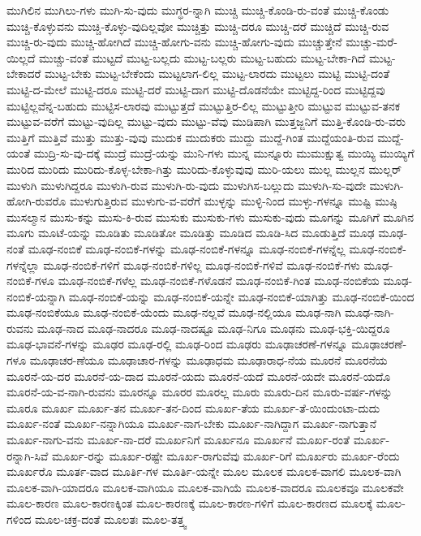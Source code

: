 {ಮುಗಿಲಿನ
ಮುಗಿಲು-ಗಳು
ಮುಗಿ-ಸು-ವುದು
ಮುಗ್ಧರ-ನ್ನಾಗಿ
ಮುಚ್ಚಿ
ಮುಚ್ಚಿ-ಕೊಂಡಿ-ರು-ವಂತೆ
ಮುಚ್ಚಿ-ಕೊಂಡು
ಮುಚ್ಚಿ-ಕೊಳ್ಳುವನು
ಮುಚ್ಚಿ-ಕೊಳ್ಳು-ವುದಿಲ್ಲವೋ
ಮುಚ್ಚಿತ್ತು
ಮುಚ್ಚಿ-ದರೂ
ಮುಚ್ಚಿ-ದರೆ
ಮುಚ್ಚಿದೆ
ಮುಚ್ಚಿ-ರುವ
ಮುಚ್ಚಿ-ರು-ವುದು
ಮುಚ್ಚಿ-ಹೋಗಿದೆ
ಮುಚ್ಚಿ-ಹೋಗು-ವನು
ಮುಚ್ಚಿ-ಹೋಗು-ವುದು
ಮುಚ್ಚುತ್ತೇನೆ
ಮುಚ್ಚು-ಮರೆ-ಯಿಲ್ಲದೆ
ಮುಚ್ಚು-ವಂತೆ
ಮುಟ್ಟದೆ
ಮುಟ್ಟ-ಬಲ್ಲದು
ಮುಟ್ಟ-ಬಲ್ಲರು
ಮುಟ್ಟ-ಬಹುದು
ಮುಟ್ಟ-ಬೇಕಾ-ಗಿದೆ
ಮುಟ್ಟ-ಬೇಕಾದರೆ
ಮುಟ್ಟ-ಬೇಕು
ಮುಟ್ಟ-ಬೇಕೆಂದು
ಮುಟ್ಟಲಾಗ-ಲಿಲ್ಲ
ಮುಟ್ಟ-ಲಾರದು
ಮುಟ್ಟಲು
ಮುಟ್ಟಿ
ಮುಟ್ಟಿ-ದಂತೆ
ಮುಟ್ಟಿ-ದ-ಮೇಲೆ
ಮುಟ್ಟಿ-ದರೂ
ಮುಟ್ಟಿ-ದರೆ
ಮುಟ್ಟಿ-ದಾಗ
ಮುಟ್ಟಿ-ದೊಡನೆಯೇ
ಮುಟ್ಟಿದ್ದ-ರಿಂದ
ಮುಟ್ಟಿದ್ದವು
ಮುಟ್ಟಿಲ್ಲವೆನ್ನ-ಬಹುದು
ಮುಟ್ಟಿಸ-ಲಾರವು
ಮುಟ್ಟುತ್ತದೆ
ಮುಟ್ಟುತ್ತಿರ-ಲಿಲ್ಲ
ಮುಟ್ಟುತ್ತೀರಿ
ಮುಟ್ಟುವ
ಮುಟ್ಟುವ-ತನಕ
ಮುಟ್ಟುವ-ವರೆಗೆ
ಮುಟ್ಟು-ವುದಿಲ್ಲ
ಮುಟ್ಟು-ವುದು
ಮುಟ್ಟು-ವೆವು
ಮುಡಿಪಾಗಿ
ಮುತ್ತಜ್ಜನಿಗೆ
ಮುತ್ತಿ-ಕೊಂಡಿ-ರು-ವರು
ಮುತ್ತಿಗೆ
ಮುತ್ತಿವೆ
ಮುತ್ತು
ಮುತ್ತು-ವುವು
ಮುದುಕ
ಮುದುಕರು
ಮುದ್ದು
ಮುದ್ದೆ-ಗಿಂತ
ಮುದ್ದೆಯಂತಿ-ರುವ
ಮುದ್ದೆ-ಯಂತೆ
ಮುದ್ರಿ-ಸು-ವು-ದಕ್ಕೆ
ಮುದ್ರೆ
ಮುದ್ರೆ-ಯನ್ನು
ಮುನಿ-ಗಳು
ಮುನ್ನ
ಮುನ್ನೂರು
ಮುಮುಕ್ಷುತ್ವ
ಮುಯ್ಯಿ
ಮುಯ್ಯಿಗೆ
ಮುರಿದ
ಮುರಿದು
ಮುರಿದು-ಕೊಳ್ಳ-ಬೇಕಾ-ಗಿತ್ತು
ಮುರಿದು-ಕೊಳ್ಳುವುವು
ಮುರಿ-ಯಲು
ಮುಲ್ಲ
ಮುಲ್ಲನ
ಮುಲ್ಲರ್
ಮುಳುಗಿ
ಮುಳುಗಿದ್ದರೂ
ಮುಳುಗಿ-ರುವ
ಮುಳುಗಿ-ರು-ವುದು
ಮುಳುಗಿಸ-ಬಲ್ಲುದು
ಮುಳುಗಿ-ಸು-ವುದೇ
ಮುಳುಗಿ-ಹೋಗಿ-ರುವರೊ
ಮುಳುಗುತ್ತಿರುವ
ಮುಳುಗು-ವ-ವರೆಗೆ
ಮುಳ್ಳನ್ನು
ಮುಳ್ಳಿ-ನಿಂದ
ಮುಳ್ಳು-ಗಳನ್ನೂ
ಮುಷ್ಟಿ
ಮುಷ್ಠಿ
ಮುಸಲ್ಮಾನ
ಮುಸು-ಕನ್ನು
ಮುಸು-ಕಿ-ರುವ
ಮುಸುಕು
ಮುಸುಕು-ಗಳು
ಮುಸುಕು-ವುದು
ಮೂಗನ್ನು
ಮೂಗಿಗೆ
ಮೂಗಿನ
ಮೂಗು
ಮೂಟೆ-ಯನ್ನು
ಮೂಡಿತು
ಮೂಡಿತೋ
ಮೂಡಿತ್ತು
ಮೂಡಿದ
ಮೂಡಿ-ಸಿದ
ಮೂಡುತ್ತಿದೆ
ಮೂಢ
ಮೂಢ-ನಂತೆ
ಮೂಢ-ನಂಬಿಕೆ
ಮೂಢ-ನಂಬಿಕೆ-ಗಳನ್ನು
ಮೂಢ-ನಂಬಿಕೆ-ಗಳನ್ನೂ
ಮೂಢ-ನಂಬಿಕೆ-ಗಳನ್ನೆಲ್ಲ
ಮೂಢ-ನಂಬಿಕೆ-ಗಳನ್ನೆಲ್ಲಾ
ಮೂಢ-ನಂಬಿಕೆ-ಗಳಿಗೆ
ಮೂಢ-ನಂಬಿಕೆ-ಗಳಿಲ್ಲ
ಮೂಢ-ನಂಬಿಕೆ-ಗಳಿವೆ
ಮೂಢ-ನಂಬಿಕೆ-ಗಳು
ಮೂಢ-ನಂಬಿಕೆ-ಗಳೂ
ಮೂಢ-ನಂಬಿಕೆ-ಗಳೆಲ್ಲ
ಮೂಢ-ನಂಬಿಕೆ-ಗಳೊಡನೆ
ಮೂಢ-ನಂಬಿಕೆ-ಗಿಂತ
ಮೂಢ-ನಂಬಿಕೆಯ
ಮೂಢ-ನಂಬಿಕೆ-ಯನ್ನಾಗಿ
ಮೂಢ-ನಂಬಿಕೆ-ಯನ್ನು
ಮೂಢ-ನಂಬಿಕೆ-ಯನ್ನೇ
ಮೂಢ-ನಂಬಿಕೆ-ಯಾಗಿತ್ತು
ಮೂಢ-ನಂಬಿಕೆ-ಯಿಂದ
ಮೂಢ-ನಂಬಿಕೆಯೂ
ಮೂಢ-ನಂಬಿಕೆ-ಯೆಂದು
ಮೂಢ-ನಲ್ಲವೆ
ಮೂಢ-ನಲ್ಲಿಯೂ
ಮೂಢ-ನಾಗಿ
ಮೂಢ-ನಾಗಿ-ರುವನು
ಮೂಢ-ನಾದ
ಮೂಢ-ನಾದರೂ
ಮೂಢ-ನಾದಷ್ಟೂ
ಮೂಢ-ನಿಗೂ
ಮೂಢನು
ಮೂಢ-ಭಕ್ತಿ-ಯಿದ್ದರೂ
ಮೂಢ-ಭಾವನೆ-ಗಳನ್ನು
ಮೂಢರ
ಮೂಢ-ರಲ್ಲಿ
ಮೂಢ-ರಿಂದ
ಮೂಢರು
ಮೂಢಾಚರಣೆ-ಗಳನ್ನೂ
ಮೂಢಾಚರಣೆ-ಗಳೂ
ಮೂಢಾಚರ-ಣೆಯೂ
ಮೂಢಾಚಾರ-ಗಳನ್ನು
ಮೂಢಾಧಮ
ಮೂಢಾರಾಧ-ನೆಯ
ಮೂರನೆ
ಮೂರನೆಯ
ಮೂರನೆ-ಯ-ದರ
ಮೂರನೆ-ಯ-ದಾದ
ಮೂರನೆ-ಯದು
ಮೂರನೆ-ಯದೆ
ಮೂರನೆ-ಯದೇ
ಮೂರನೆ-ಯದೊ
ಮೂರನೆ-ಯ-ವ-ನಾಗಿ-ರುವನು
ಮೂರನ್ನೂ
ಮೂರರ
ಮೂರಲ್ಲ
ಮೂರು
ಮೂರು-ದಿನ
ಮೂರು-ವರ್ಷ-ಗಳನ್ನು
ಮೂರೂ
ಮೂರ್ಖ
ಮೂರ್ಖ-ತನ
ಮೂರ್ಖ-ತನ-ದಿಂದ
ಮೂರ್ಖ-ತೆಯ
ಮೂರ್ಖ-ತೆ-ಯಿಂದುಂಟಾ-ದುದು
ಮೂರ್ಖ-ನಂತೆ
ಮೂರ್ಖ-ನನ್ನಾಗಿಯೂ
ಮೂರ್ಖ-ನಾಗ-ಬೇಕು
ಮೂರ್ಖ-ನಾಗಿದ್ದಾಗ
ಮೂರ್ಖ-ನಾಗುತ್ತಾನೆ
ಮೂರ್ಖ-ನಾಗು-ವನು
ಮೂರ್ಖ-ನಾ-ದರೆ
ಮೂರ್ಖನಿಗೆ
ಮೂರ್ಖನೂ
ಮೂರ್ಖನೆ
ಮೂರ್ಖ-ರಂತೆ
ಮೂರ್ಖ-ರನ್ನಾಗಿ-ಸಿವೆ
ಮೂರ್ಖ-ರನ್ನು
ಮೂರ್ಖ-ರಷ್ಟೇ
ಮೂರ್ಖ-ರಾಗುವೆವು
ಮೂರ್ಖ-ರಿಗೆ
ಮೂರ್ಖರು
ಮೂರ್ಖ-ರೆಂದು
ಮೂರ್ಖರೊ
ಮೂರ್ತ-ವಾದ
ಮೂರ್ತಿ-ಗಳ
ಮೂರ್ತಿ-ಯನ್ನೇ
ಮೂಲ
ಮೂಲಕ
ಮೂಲಕ-ವಾಗಲಿ
ಮೂಲಕ-ವಾಗಿ
ಮೂಲಕ-ವಾಗಿ-ಯಾದರೂ
ಮೂಲಕ-ವಾಗಿಯೂ
ಮೂಲಕ-ವಾಗಿಯೆ
ಮೂಲಕ-ವಾದರೂ
ಮೂಲಕವೂ
ಮೂಲಕವೇ
ಮೂಲ-ಕಾರಣ
ಮೂಲ-ಕಾರಣಕ್ಕಿಂತ
ಮೂಲ-ಕಾರಣಕ್ಕೆ
ಮೂಲ-ಕಾರಣ-ಗಳಿಗೆ
ಮೂಲ-ಕಾರಣದ
ಮೂಲಕ್ಕೆ
ಮೂಲ-ಗಳಿಂದ
ಮೂಲ-ಚಕ್ರ-ದಂತೆ
ಮೂಲತಃ
ಮೂಲ-ತತ್ತ್ವ
}

